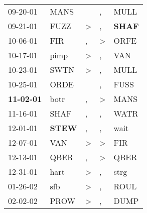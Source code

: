 \begin{supertabular}{p{0.07\textwidth}p{0.06\textwidth}p{0.02\textwidth}p{0.02\textwidth}p{0.06\textwidth}}
          09-20-01\textsuperscript{} &           MANS\textsuperscript{} &                  &                , &           MULL\textsuperscript{} \\
          09-21-01\textsuperscript{} &           FUZZ\textsuperscript{} &     \textgreater &                , &  \textbf{SHAF\textsuperscript{}} \\
          10-06-01\textsuperscript{} &            FIR\textsuperscript{} &                , &     \textgreater &           ORFE\textsuperscript{} \\
          10-17-01\textsuperscript{} &           pimp\textsuperscript{} &     \textgreater &                , &            VAN\textsuperscript{} \\
          10-23-01\textsuperscript{} &           SWTN\textsuperscript{} &     \textgreater &                , &           MULL\textsuperscript{} \\
          10-25-01\textsuperscript{} &           ORDE\textsuperscript{} &                  &                , &           FUSS\textsuperscript{} \\
 \textbf{11-02-01\textsuperscript{}} &           botr\textsuperscript{} &                , &     \textgreater &           MANS\textsuperscript{} \\
          11-16-01\textsuperscript{} &           SHAF\textsuperscript{} &                , &                , &           WATR\textsuperscript{} \\
          12-01-01\textsuperscript{} &  \textbf{STEW\textsuperscript{}} &                , &                , &           wait\textsuperscript{} \\
          12-07-01\textsuperscript{} &            VAN\textsuperscript{} &     \textgreater &     \textgreater &            FIR\textsuperscript{} \\
          12-13-01\textsuperscript{} &           QBER\textsuperscript{} &                , &     \textgreater &           QBER\textsuperscript{} \\
          12-31-01\textsuperscript{} &           hart\textsuperscript{} &     \textgreater &                , &           strg\textsuperscript{} \\
          01-26-02\textsuperscript{} &            sfb\textsuperscript{} &     \textgreater &                , &           ROUL\textsuperscript{} \\
          02-02-02\textsuperscript{} &           PROW\textsuperscript{} &     \textgreater &                , &           DUMP\textsuperscript{} \\

\end{supertabular}

